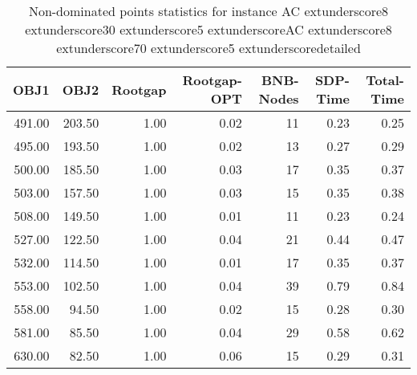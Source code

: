 \begin{table}
\caption{Non-dominated points statistics for instance AC	extunderscore8	extunderscore30	extunderscore5	extunderscoreAC	extunderscore8	extunderscore70	extunderscore5	extunderscoredetailed}
\label{tab:plots/AC_8_30_5_AC_8_70_5_detailed}
\begin{tabular}{rrrrrrr}
\toprule
OBJ1 & OBJ2 & Rootgap & Rootgap-OPT & BNB-Nodes & SDP-Time & Total-Time \\
\midrule
491.00 & 203.50 & 1.00 & 0.02 & 11 & 0.23 & 0.25 \\
495.00 & 193.50 & 1.00 & 0.02 & 13 & 0.27 & 0.29 \\
500.00 & 185.50 & 1.00 & 0.03 & 17 & 0.35 & 0.37 \\
503.00 & 157.50 & 1.00 & 0.03 & 15 & 0.35 & 0.38 \\
508.00 & 149.50 & 1.00 & 0.01 & 11 & 0.23 & 0.24 \\
527.00 & 122.50 & 1.00 & 0.04 & 21 & 0.44 & 0.47 \\
532.00 & 114.50 & 1.00 & 0.01 & 17 & 0.35 & 0.37 \\
553.00 & 102.50 & 1.00 & 0.04 & 39 & 0.79 & 0.84 \\
558.00 & 94.50 & 1.00 & 0.02 & 15 & 0.28 & 0.30 \\
581.00 & 85.50 & 1.00 & 0.04 & 29 & 0.58 & 0.62 \\
630.00 & 82.50 & 1.00 & 0.06 & 15 & 0.29 & 0.31 \\
\bottomrule
\end{tabular}
\end{table}
